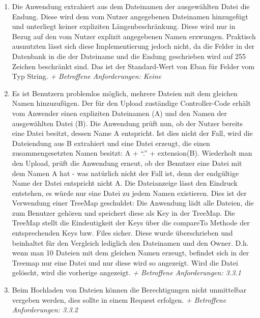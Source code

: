\documentclass[12pt,DIV14,BCOR10mm,a4paper,parskip=half-,headsepline,headinclude,english,ngerman,bibliography=totocnumbered]{scrreprt}
\begin{document}
\begin{enumerate}
\item Die Anwendung extrahiert aus dem Dateinamen der ausgewählten Datei die Endung. Diese wird dem vom Nutzer angegebenen Dateinamen hinzugefügt und unterliegt keiner expliziten  Längenbeschränkung. Diese wird nur in Bezug auf den vom Nutzer explizit angegebenen Namen erzwungen. Praktisch ausnutzten lässt sich diese Implementierung jedoch nicht, da die Felder in der Datenbank in die der Dateiname und die Endung geschrieben wird auf 255 Zeichen beschränkt sind. Das ist der Standard-Wert von Eban für Felder vom Typ String. \newline
\textit{+ Betroffene Anforderungen: Keine}


\item Es ist Benutzern problemlos möglich, mehrere Dateien mit dem gleichen Namen hinzuzufügen. Der für den Upload zuständige Controller-Code erhält vom Anwender einen expliziten Dateinamen (A) und den Namen der ausgewählten Datei (B). Die Anwendung prüft nun, ob der Nutzer bereits eine Datei besitzt, dessen Name A entspricht. Ist dies nicht der Fall, wird die Dateiendung aus B extrahiert und eine Datei erzeugt, die einen zusammengesetzten Namen besitzt: A + \enquote{.} + extension(B).
Wiederholt man den Upload, prüft die Anwendung erneut, ob der Benutzer eine Datei mit dem Namen A hat - was natürlich nicht der Fall ist, denn der endgültige Name der Datei entspricht nicht A.
Die Dateianzeige lässt den Eindruck entstehen, es würde nur eine Datei zu jedem Namen existieren. Dies ist der Verwendung einer TreeMap geschuldet: Die Anwendung lädt alle Dateien, die zum Benutzer gehören und speichert diese als Key in der TreeMap. Die TreeMap stellt die Eindeutigkeit der Keys über die compareTo Methode der entsprechenden Keys bzw. Files sicher. Diese wurde überschrieben und beinhaltet für den Vergleich lediglich den Dateinamen und den Owner. D.h. wenn man 10 Dateien mit dem gleichen Namen erzeugt, befindet sich in der Treemap nur eine Datei und nur diese wird so angezeigt. Wird die Datei gelöscht, wird die vorherige angezeigt.\newline
\textit{+ Betroffene Anforderungen: 3.3.1}

\item Beim Hochladen von Dateien können die Berechtigungen nicht unmittelbar vergeben werden, dies sollte in einem Request erfolgen.\newline
\textit{+ Betroffene Anforderungen: 3.3.2}
  \end{enumerate}
\end{document}
